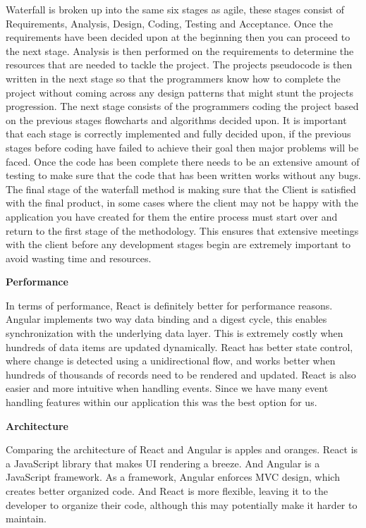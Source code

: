 Waterfall is broken up into the same six stages as agile, these stages consist of Requirements, Analysis, Design, Coding, Testing and Acceptance. Once the requirements have been decided upon at the beginning then you can proceed to the next stage. Analysis is then performed on the requirements to determine the resources that are needed to tackle the project. The projects pseudocode is then written in the next stage so that the programmers know how to complete the project without coming across any design patterns that might stunt the projects progression. The next stage consists of the programmers coding the project based on the previous stages flowcharts and algorithms decided upon. It is important that each stage is correctly implemented and fully decided upon, if the previous stages before coding have failed to achieve their goal then major problems will be faced. Once the code has been complete there needs to be an extensive amount of testing to make sure that the code that has been written works without any bugs. The final stage of the waterfall method is making sure that the Client is satisfied with the final product, in some cases where the client may not be happy with the application you have created for them the entire process must start over and return to the first stage of the methodology. This ensures that extensive meetings with the client before any development stages begin are extremely important to avoid wasting time and resources. \cite{waterfall}


\textbf{Performance}

In terms of performance, React is definitely better for performance reasons. Angular implements two way data binding and a digest cycle, this enables synchronization with the underlying data layer. This is extremely costly when hundreds of data items are updated dynamically. React has better state control, where change is detected using a unidirectional flow, and works better when hundreds of thousands of records need to be rendered and updated. React is also easier and more intuitive when handling events. Since we have many event handling features within our application this was the best option for us.

\textbf{Architecture}

Comparing the architecture of React and Angular is apples and oranges. React is a JavaScript library that makes UI rendering a breeze. And Angular is a JavaScript framework. As a framework, Angular enforces MVC design, which creates better organized code. And React is more flexible, leaving it to the developer to organize their code, although this may potentially make it harder to maintain.

